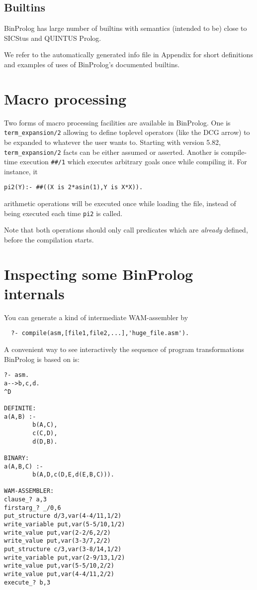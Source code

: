 \documentclass{article}
\begin{document}
\subsection{Builtins}

BinProlog has large number of builtins with semantics
(intended to be) close to SICStus and QUINTUS Prolog.

We refer to the automatically generated info file in Appendix
for short definitions and examples of uses of BinProlog's
documented builtins.

\section{Macro processing}

Two forms of macro processing facilities are available in BinProlog.
One is {\tt term\_expansion/2} allowing to define toplevel
operators (like the DCG arrow) to be expanded to whatever the
user wants to. Starting with version 5.82, {\tt term\_expansion/2}
facts can be either assumed or asserted.
Another is compile-time execution {\tt \#\#/1} which
executes arbitrary goals once while compiling it. For instance, it

\begin{verbatim}
pi2(Y):- ##((X is 2*asin(1),Y is X*X)).
\end{verbatim}

arithmetic operations
will be executed once while loading the file, instead of
being executed each time {\tt pi2} is called. 

Note that both operations should only call predicates
which are {\em already} defined,
before the compilation starts.

\section{Inspecting some BinProlog internals}

{\flushleft You} can generate a kind of intermediate WAM-assembler by

\begin{verbatim}
  ?- compile(asm,[file1,file2,...],'huge_file.asm').
\end{verbatim}

{\flushleft A} convenient way to see interactively the sequence of program
transformations BinProlog is based on is:

\begin{verbatim}
?- asm.
a-->b,c,d.
^D

DEFINITE:
a(A,B) :- 
        b(A,C),
        c(C,D),
        d(D,B).

BINARY:
a(A,B,C) :- 
        b(A,D,c(D,E,d(E,B,C))).

WAM-ASSEMBLER:
clause_? a,3
firstarg_? _/0,6
put_structure d/3,var(4-4/11,1/2)
write_variable put,var(5-5/10,1/2)
write_value put,var(2-2/6,2/2)
write_value put,var(3-3/7,2/2)
put_structure c/3,var(3-8/14,1/2)
write_variable put,var(2-9/13,1/2)
write_value put,var(5-5/10,2/2)
write_value put,var(4-4/11,2/2)
execute_? b,3
\end{verbatim}
\end{document}
